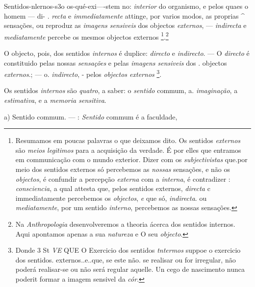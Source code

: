 
Sentidos-nlernos-s3o os-qué-exi----stem no: \emph{interior} do organismo, e pelos quaes o homem --- di- . \emph{recta} e \emph{immediatamente} attinge, por varios modos, as proprias \textasciicircum{} sensações, ou reproduz as \emph{imagens sensiveis} dos objectos \emph{externos}, --- \emph{indirecta} e \emph{mediatamente} percebe os mesmos objectos externos \footnote{Resumamos em poucas palavras o que deixamos dito. Os sentidos \emph{externos} são \emph{meios legitimos} para a acquisição da verdade. É por elles que entramos em communicação com o mundo exterior. Dizer com os \emph{subjectivistas} que.por meio dos sentidos externos só percebemos as \emph{nossas} sensações, e não os \emph{objectos}, é confundir a percepção \emph{externa} com a \emph{interna}, é contradizer : \emph{consciencia}, a qual attesta que, pelos sentidos externos, \emph{directa} c immediatamente percebemos os \emph{objectos}, \emph{e} que só, \emph{indirecta}. ou \emph{mediatamente}, por um sentido \emph{interno}, percebemos as nossas sensações.}.\footnote{Na \emph{Anthropologia} desenvolveremos a theoria ácerca dos sentidos internos. Aqui apontamos apenas a sua \emph{natureza} e O seu \emph{objecto}.}


 
O objecto, pois, dos sentidos \emph{internos} é duplice: \emph{directo} e \emph{indirecto}. --- O \emph{directo} é constituido pelas nossas \emph{sensações} e pelas \emph{imagens sensiveis} dos . objectos \emph{externos}.; --- o. \emph{indirecto}, - pelos \emph{objectos externos} \footnote{Donde 3 St \emph{VE} \textsc{QUE} O Exercicio dos sentidos \emph{tntermos} suppoe o exercicio dos sentidos. externos..e..que, se este não. se realisar ou for irregular, não poderá realisar-se ou não será regular aquelle. Un cego de nascimento nunca poderit formar a imagem sensivel da \emph{cór}.}. \textbar{}


Os sentidos \emph{internos} são \emph{quatro}, a saber: o \emph{sentido} commum, a. \emph{imaginação}, a \emph{estimativa}, e a \emph{memoria sensitiva}.

a) Sentido commum. --- : \emph{Sentido} commum é a faculdade,

